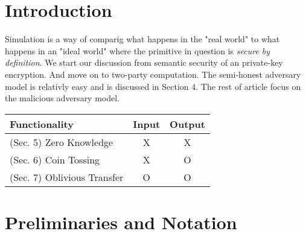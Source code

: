 \vspace*{4mm} 

\section{Introduction}
Simulation is a way of comparig what happens in the "real world" to what happens in an "ideal world" where the primitive in question is {\it secure by definition}. We start our discussion from semantic security of an private-key encryption. And move on to two-party computation. The semi-honest adversary model is relativly easy and is discussed in Section 4. The rest of article focus on the malicious adversary model.

\vspace{4mm}
\begin{tabular}{|l|c|c|}
\hline
Functionality & Input & Output\\
\hline
(Sec. 5) Zero Knowledge & X & X\\
(Sec. 6) Coin Tossing & X & O \\
(Sec. 7) Oblivious Transfer & O & O \\
\hline
\end{tabular}

\section{Preliminaries and Notation}

